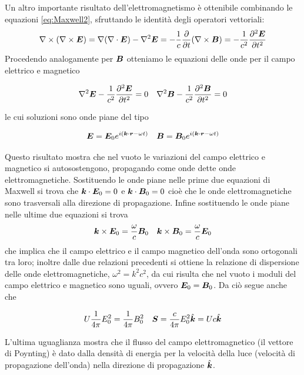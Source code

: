 Un altro importante risultato dell'elettromagnetismo è ottenibile combinando le equazioni \ref{eq:Maxwell2}, sfruttando le identità degli operatori vettoriali:
\begin{equation}
\Rot{}(\Rot{E})=\Grad(\Div{E}) - \Grad^2\V{E} = -\inv{c}\derP{}{t}(\Rot{B}) = -\inv{c^2}\derPn{\V{E}}{t}{2}
\end{equation}
Procedendo analogamente per $\V{B}$ otteniamo le equazioni delle onde per il campo elettrico e magnetico
\begin{EQ}
\begin{align}
&\Grad^2 \V{E} -\inv{c^2}\derPn{\V{E}}{t}{2} = 0
&\Grad^2 \V{B} -\inv{c^2}\derPn{\V{B}}{t}{2} = 0
\end{align}
\end{EQ}
le cui soluzioni sono onde piane del tipo
\begin{EQ}
\begin{align}
&\V{E}=\V{E}_0 e^{i(\scal{k}{r}-\omega t)}
&\V{B}=\V{B}_0 e^{i(\scal{k}{r}-\omega t)}
\end{align}
\end{EQ}
Questo risultato mostra che nel vuoto le variazioni del campo elettrico e magnetico si autosostengono, propagando come onde dette onde elettromagnetiche. Sostituendo le onde piane nelle prime due equazioni di Maxwell si trova che $\scal{k}{E}_0=0$ e $\scal{k}{B}_0=0$ cioè che le onde elettromagnetiche sono trasversali alla direzione di propagazione. Infine sostituendo le onde piane nelle ultime due equazioni si trova 
\begin{align}
&\vett{k}{E}_0 = \dfrac{\omega}{c} \V{B}_0
&\vett{k}{B}_0 = \dfrac{\omega}{c} \V{E}_0
\end{align}
che implica che il campo elettrico e il campo magnetico dell'onda sono ortogonali tra loro; inoltre dalle due relazioni precedenti si ottiene la relazione di dispersione delle onde elettromagnetiche, $\omega^2=k^2c^2$, da cui risulta che nel vuoto i moduli del campo elettrico e magnetico sono uguali, ovvero $\V{E}_0=\V{B}_0$. Da ciò segue anche che 
\begin{EQ}
\begin{align}
&U\inv{4\pi}E_0^2 = \inv{4\pi}B_0^2
&\V{S} = \dfrac{c}{4\pi} E_0^2 \vers{k} = Uc\vers{k}
\end{align}
\end{EQ}
L'ultima uguaglianza mostra che il flusso del campo elettromagnetico (il vettore di Poynting) è dato dalla densità di energia per la velocità della luce (velocità di propagazione dell'onda) nella direzione di propagazione $\vers{k}$.

